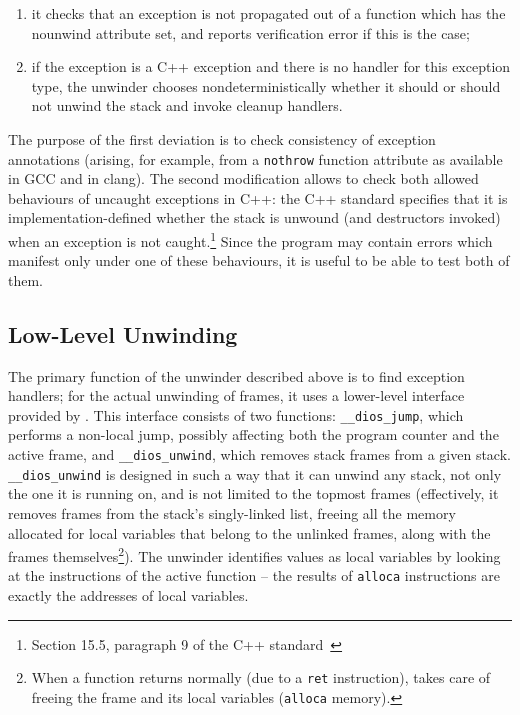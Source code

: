 \begin{enumerate}
\def\labelenumi{\roman{enumi}.}
\tightlist
\item
  it checks that an exception is not propagated out of a function which
  has the nounwind attribute set, and reports verification error if this
  is the case;
\item
  if the exception is a C++ exception and there is no handler for this
  exception type, the unwinder chooses nondeterministically whether it
  should or should not unwind the stack and invoke cleanup handlers.
\end{enumerate}

The purpose of the first deviation is to check consistency of exception
annotations (arising, for example, from a \texttt{nothrow} function
attribute as available in GCC and in clang). The second modification
allows \divine{} to check both allowed behaviours of uncaught exceptions in
C++: the C++ standard specifies that it is implementation-defined
whether the stack is unwound (and destructors invoked) when an exception
is not caught.\footnote{Section 15.5, paragraph 9 of the C++
  standard~\cite{cxx14:standar.program}} Since the program may contain
errors which manifest only under one of these behaviours, it is useful
to be able to test both of them.

\subsection{Low-Level Unwinding}\label{sec:unwinder:ll}

The primary function of the unwinder described above is to find
exception handlers; for the actual unwinding of frames, it uses a
lower-level interface provided by \dios{}. This interface consists of two
functions: \texttt{\_\_dios\_jump}, which performs a non-local jump,
possibly affecting both the program counter and the active frame, and
\texttt{\_\_dios\_unwind}, which removes stack frames from a given
stack. \texttt{\_\_dios\_unwind} is designed in such a way that it can
unwind any stack, not only the one it is running on, and is not limited
to the topmost frames (effectively, it removes frames from the stack's
singly-linked list, freeing all the memory allocated for local variables
that belong to the unlinked frames, along with the frames
themselves\footnote{When a function returns normally (due to a
  \texttt{ret} instruction), \divm{} takes care of freeing the frame and
  its local variables (\texttt{alloca} memory).}). The unwinder
identifies values as local variables by looking at the instructions of
the active function -- the results of \texttt{alloca} instructions are
exactly the addresses of local variables.

